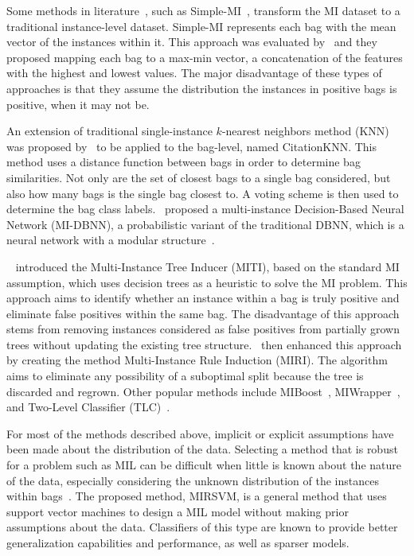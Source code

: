 Some methods in literature~\citep{Ray2005,Viola2005}, such as Simple-MI~\citep{Dong2006}, transform the MI dataset to a traditional instance-level dataset. Simple-MI represents each bag with the mean vector of the instances within it. This approach was evaluated by~\cite{Bunescu2007} and they proposed mapping each bag to a max-min vector, a concatenation of the features with the highest and lowest values. The major disadvantage of these types of approaches is that they assume the distribution the instances in positive bags is positive, when it may not be.

An extension of traditional single-instance $k$-nearest neighbors method (KNN) was proposed by~\cite{Wang2000} to be applied to the bag-level, named CitationKNN. This method uses a distance function between bags in order to determine bag similarities. Not only are the set of closest bags to a single bag  considered, but also how many bags is the single bag closest to. A voting scheme is then used to determine the bag class labels.~\cite{Xu2011} proposed a multi-instance Decision-Based Neural Network (MI-DBNN), a probabilistic variant of the traditional DBNN, which is a neural network with a modular structure~\citep{Herrera2016}.

~\cite{Blockeel2005} introduced the Multi-Instance Tree Inducer (MITI), based on the standard MI assumption, which uses decision trees as a heuristic to solve the MI problem. This approach aims to identify whether an instance within a bag is truly positive and eliminate false positives within the same bag. The disadvantage of this approach stems from removing instances considered as false positives from partially grown trees without updating the existing tree structure.~\cite{Bjerring2011} then enhanced this approach by creating the method Multi-Instance Rule Induction (MIRI). The algorithm aims to eliminate any possibility of a suboptimal split because the tree is discarded and regrown. Other popular methods include MIBoost~\citep{Hall2009}, MIWrapper~\citep{Hall2009}, and Two-Level Classifier (TLC)~\citep{Wang2014}.

For most of the methods described above, implicit or explicit assumptions have been made about the distribution of the data. Selecting a method that is robust for a problem such as MIL can be difficult when little is known about the nature of the data, especially considering the unknown distribution of the instances within bags~\citep{2015-KAIS,2016-INS-MIARM}. The proposed method, MIRSVM, is a general method that uses support vector machines to design a MIL model without making prior assumptions about the data. Classifiers of this type are known to provide better generalization capabilities and performance, as well as sparser models.

